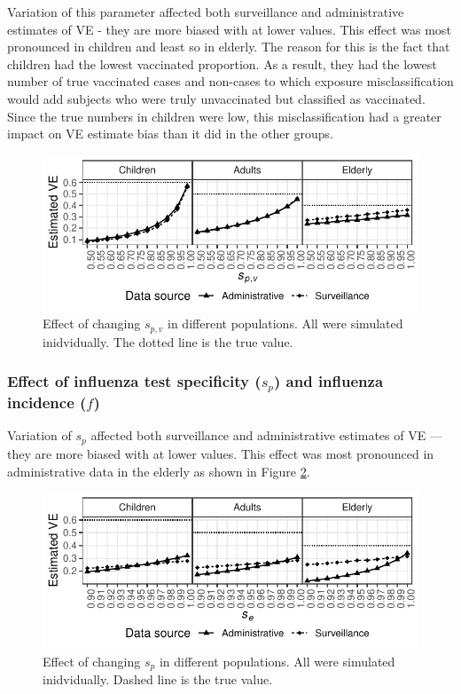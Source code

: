 \documentclass[11pt]{article}
\begin{document}
Variation of this parameter affected both surveillance and administrative estimates of VE - they are more biased with at lower values. This effect was most pronounced in children and least so in elderly. The reason for this is the fact that children had the lowest vaccinated proportion. As a result, they had the lowest number of true vaccinated cases and non-cases to which exposure misclassification would add subjects who were truly unvaccinated but classified as vaccinated. Since the true numbers in children were low, this misclassification had a greater impact on VE estimate bias than it did in the other groups.

\pagebreak

\begin{figure}[h]
	\centering
		\includegraphics[width=0.75\linewidth]{../fig-agesind/agesind-spec_vac.pdf}
		\caption{
Effect of changing $s_{p,v}$ in different populations. All were simulated inidvidually. The dotted line is the true value. \label{fig:agesind-spv}
		}
\end{figure}

\subsubsection{Effect of influenza test specificity ($s_p$) and influenza incidence ($f$)}

Variation of $s_p$ affected both surveillance and administrative estimates of VE --- they are more biased with at lower values. This effect was most pronounced in administrative data in the elderly as shown in Figure \ref{fig:agesind-spf}.

\begin{figure}[h]
	\centering
		\includegraphics[width=0.75\linewidth]{../fig-agesind/agesind-spec_flu.pdf}
		\caption{
Effect of changing $s_p$ in different populations. All were simulated inidvidually. Dashed line is the true value. \label{fig:agesind-spf}
		}
\end{figure}
\end{document}
